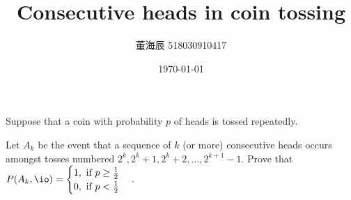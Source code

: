 

\title{Consecutive heads in coin tossing}
\date{\today}
\author{董海辰 518030910417}


\maketitle

\begin{thm}{}{}
    Suppose that a coin with probability $p$ of heads is tossed repeatedly.

    Let $A_k$ be the event that a sequence of $k$ (or more) consecutive heads occurs amongst tosses numbered $2^k, 2^k + 1,2^k+ 2,..., 2^{k+1} - 1$. Prove that
    \begin{math}
        P(A_k, \io) = \begin{cases}
            1, \text{ if } p \ge \frac{1}{2} \\
            0, \text{ if } p < \frac{1}{2}
        \end{cases}
    .\end{math}
\end{thm}

